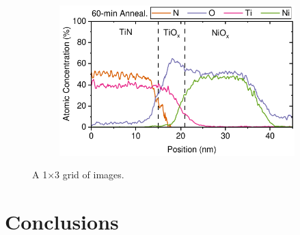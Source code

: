 \begin{figure}[htbp]
    \centering
    \begin{subfigure}{0.55\textwidth}
        \centering
        \includegraphics[width=\textwidth]{chapters/material_properties/images/TEM_60_min.pdf}
        \caption{}
        \label{}
    \end{subfigure}
    \hspace{1cm}
    
    \caption{A 1×3 grid of images.}
    \label{}
\end{figure}


\section{Conclusions}



\cleardoublepage

